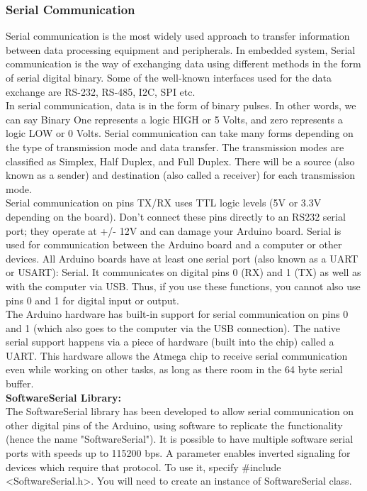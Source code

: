 \documentclass[12pt]{article}
\begin{document}
\subsubsection{Serial Communication}
\hspace*{1 cm}Serial communication is the most widely used approach to transfer information between data processing equipment and peripherals. In embedded system, Serial communication is the way of exchanging data using different methods in the form of serial digital binary. Some of the well-known interfaces used for the data exchange are RS-232, RS-485, I2C, SPI etc.\\
\hspace*{1 cm}In serial communication, data is in the form of binary pulses. In other words, we can say Binary One represents a logic HIGH or 5 Volts, and zero represents a logic LOW or 0 Volts. Serial communication can take many forms depending on the type of transmission mode and data transfer. The transmission modes are classified as Simplex, Half Duplex, and Full Duplex. There will be a source (also known as a sender) and destination (also called a receiver) for each transmission mode.\\
\hspace*{1 cm}Serial communication on pins TX/RX uses TTL logic levels (5V or 3.3V depending on the board). Don't connect these pins directly to an RS232 serial port; they operate at +/- 12V and can damage your Arduino board. Serial is used for communication between the Arduino board and a computer or other devices. All Arduino boards have at least one serial port (also known as a UART or USART): Serial. It communicates on digital pins 0 (RX) and 1 (TX) as well as with the computer via USB. Thus, if you use these functions, you cannot also use pins 0 and 1 for digital input or output.\\
\hspace*{1 cm}The Arduino hardware has built-in support for serial communication on pins 0 and 1 (which also goes to the computer via the USB connection). The native serial support happens via a piece of hardware (built into the chip) called a UART. This hardware allows the Atmega chip to receive serial communication even while working on other tasks, as long as there room in the 64 byte serial buffer.\\
\textbf{SoftwareSerial Library:}\\
\hspace*{1 cm}The SoftwareSerial library has been developed to allow serial communication on other digital pins of the Arduino, using software to replicate the functionality (hence the name "SoftwareSerial"). It is possible to have multiple software serial ports with speeds up to 115200 bps. A parameter enables inverted signaling for devices which require that protocol. To use it, specify {\#}include {\textless}SoftwareSerial.h{\textgreater}. You will need to create an instance of SoftwareSerial class.\\
\end{document}
